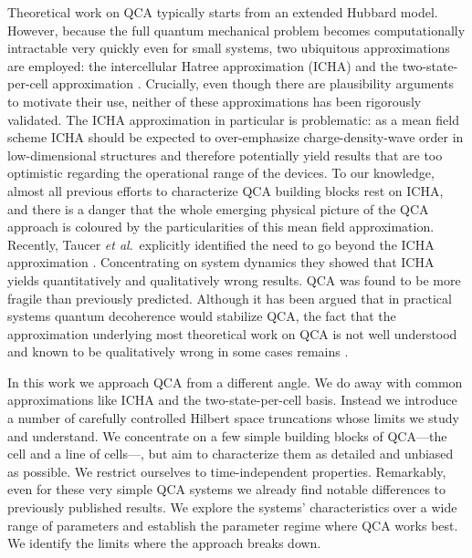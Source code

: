 Theoretical work on QCA typically starts from an extended Hubbard model.
However, because the full quantum mechanical problem becomes computationally
intractable very quickly even for small systems, two ubiquitous approximations
are employed: the intercellular Hatree approximation (ICHA) and the
two-state-per-cell approximation \cite{lent1993quantum}
\cite{tougaw1996dynamic}. Crucially, even though there are plausibility
arguments to motivate their use, neither of these approximations has been
rigorously validated. The ICHA approximation in
particular is problematic: as a mean field scheme ICHA should be expected to
over-emphasize charge-density-wave order in low-dimensional structures and
therefore potentially yield results that are too optimistic regarding the
operational range of the devices. To
our knowledge, almost all previous efforts to characterize QCA building blocks
rest on ICHA, and there is a danger that the whole emerging physical picture of
the QCA approach is coloured by the particularities of this mean field
approximation. Recently, Taucer \emph{et al}.~explicitly identified the need to go
beyond the ICHA approximation \cite{taucer2012consequences}. Concentrating on
system dynamics they showed that ICHA yields quantitatively and qualitatively
wrong results. QCA was found to be more fragile than previously predicted. Although it
has been argued that in practical systems quantum decoherence would stabilize QCA,
the fact that the approximation underlying most theoretical work on QCA is not
well understood and known to be qualitatively wrong in some cases remains
\cite{blair2013environmental}.

In this work we approach QCA from a different angle. We do away with common
approximations like ICHA and the two-state-per-cell basis.  Instead we introduce
a number of carefully controlled Hilbert space truncations whose limits we study
and understand. We concentrate on a few simple building blocks of QCA---the cell
and a line of cells---, but aim to characterize them as detailed and unbiased as
possible. We restrict ourselves to time-independent properties. Remarkably, even
for these very simple QCA systems we already find notable differences to
previously published results. We explore the systems' characteristics over a
wide range of parameters and establish the parameter regime where QCA works
best. We identify the limits where the approach breaks down.



